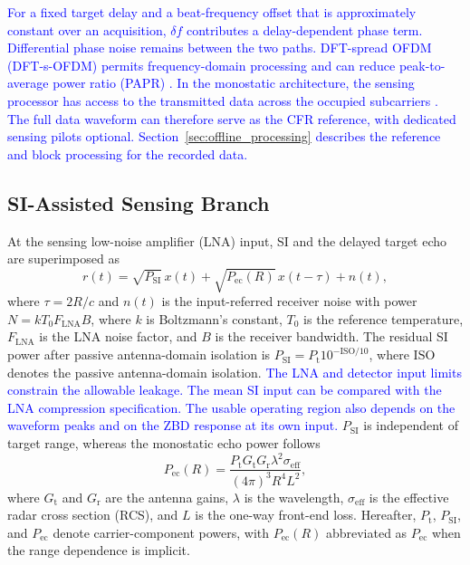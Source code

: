 \documentclass[10pt,journal]{IEEEtran}
\DeclareRobustCommand{\rev}[1]{\textcolor{blue}{#1}}
\begin{document}
\rev{For a fixed target delay and a beat-frequency offset that is
approximately constant over an acquisition, $\delta f$ contributes
a delay-dependent phase term. Differential phase noise remains
between the two paths. DFT-spread OFDM (DFT-s-OFDM) permits
frequency-domain processing and can reduce peak-to-average power
ratio (PAPR) \cite{han_thz_2024}. In the monostatic architecture, the
sensing processor has access to the transmitted data across the
occupied subcarriers \cite{keskin_monostatic_2023}. The full data
waveform can therefore serve as the CFR reference, with dedicated
sensing pilots optional. Section~\ref{sec:offline_processing}
describes the reference and block processing for the recorded data.}

\subsection{SI-Assisted Sensing Branch}
\label{sec:sens_branch}

At the sensing low-noise amplifier (LNA) input, SI and the delayed target
echo are superimposed as
\begin{equation}
r(t)=\sqrt{P_{\mathrm{SI}}}\,x(t)
+\sqrt{P_{\mathrm{ec}}(R)}\,x(t-\tau)+n(t),
\label{eq:rt}
\end{equation}
where $\tau=2R/c$ and $n(t)$ is the input-referred receiver noise with
power $N=kT_0F_{\mathrm{LNA}}B$, where $k$ is Boltzmann's constant,
$T_0$ is the reference temperature, $F_{\mathrm{LNA}}$ is the LNA noise
factor, and $B$ is the receiver bandwidth. The residual SI power after
passive antenna-domain isolation is
$P_{\mathrm{SI}}=P_{\mathrm t}10^{-\mathrm{ISO}/10}$, where
$\mathrm{ISO}$ denotes the passive antenna-domain isolation.
\rev{The LNA and detector input limits constrain the allowable leakage.
The mean SI input can be compared with the LNA compression
specification. The usable operating region also depends on the
waveform peaks and on the ZBD response at its own input.}
$P_{\mathrm{SI}}$ is independent of target range, whereas the monostatic
echo power follows \cite{skolnik_introduction_2001}
\begin{equation}
P_{\mathrm{ec}}(R)=
\frac{P_{\mathrm t}G_{\mathrm t}G_{\mathrm r}
\lambda^2\sigma_{\mathrm{eff}}}
{(4\pi)^3R^4L^2},
\label{eq:pec}
\end{equation}
where $G_{\mathrm t}$ and $G_{\mathrm r}$ are the antenna gains,
$\lambda$ is the wavelength, $\sigma_{\mathrm{eff}}$ is the effective
radar cross section (RCS), and $L$ is the one-way front-end loss.
Hereafter, $P_{\mathrm t}$, $P_{\mathrm{SI}}$, and $P_{\mathrm{ec}}$
denote carrier-component powers, with $P_{\mathrm{ec}}(R)$ abbreviated
as $P_{\mathrm{ec}}$ when the range dependence is implicit.
\end{document}
